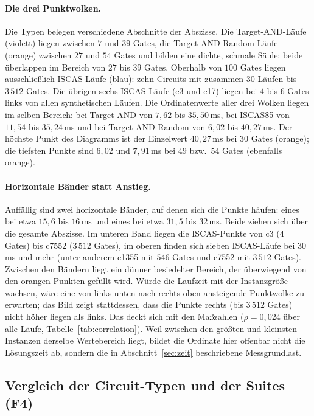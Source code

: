 \documentclass[a4paper,12pt]{article}
\theoremstyle{definition}
\begin{document}
\paragraph{Die drei Punktwolken.} Die Typen belegen verschiedene Abschnitte der Abszisse. Die Target-AND-Läufe (violett) liegen zwischen $7$ und $39$ Gates, die Target-AND-Random-Läufe (orange) zwischen $27$ und $54$ Gates und bilden eine dichte, schmale Säule; beide überlappen im Bereich von $27$ bis $39$ Gates. Oberhalb von $100$ Gates liegen ausschließlich ISCAS-Läufe (blau): zehn Circuits mit zusammen $30$ Läufen bis $3\,512$ Gates. Die übrigen sechs ISCAS-Läufe (c3 und c17) liegen bei $4$ bis $6$ Gates links von allen synthetischen Läufen. Die Ordinatenwerte aller drei Wolken liegen im selben Bereich: bei Target-AND von $7{,}62$ bis $35{,}50$\,ms, bei ISCAS\'85 von $11{,}54$ bis $35{,}24$\,ms und bei Target-AND-Random von $6{,}02$ bis $40{,}27$\,ms. Der höchste Punkt des Diagramms ist der Einzelwert $40{,}27$\,ms bei $30$ Gates (orange); die tiefsten Punkte sind $6{,}02$ und $7{,}91$\,ms bei $49$ bzw.\ $54$ Gates (ebenfalls orange).

\paragraph{Horizontale Bänder statt Anstieg.} Auffällig sind zwei horizontale Bänder, auf denen sich die Punkte häufen: eines bei etwa $15{,}6$ bis $16$\,ms und eines bei etwa $31{,}5$ bis $32$\,ms. Beide ziehen sich über die gesamte Abszisse. Im unteren Band liegen die ISCAS-Punkte von c3 ($4$ Gates) bis c7552 ($3\,512$ Gates), im oberen finden sich sieben ISCAS-Läufe bei $30$\,ms und mehr (unter anderem c1355 mit $546$ Gates und c7552 mit $3\,512$ Gates). Zwischen den Bändern liegt ein dünner besiedelter Bereich, der überwiegend von den orangen Punkten gefüllt wird. Würde die Laufzeit mit der Instanzgröße wachsen, wäre eine von links unten nach rechts oben ansteigende Punktwolke zu erwarten; das Bild zeigt stattdessen, dass die Punkte rechts (bis $3\,512$ Gates) nicht höher liegen als links. Das deckt sich mit den Maßzahlen ($\rho = 0{,}024$ über alle Läufe, Tabelle~\ref{tab:correlation}). Weil zwischen den größten und kleinsten Instanzen derselbe Wertebereich liegt, bildet die Ordinate hier offenbar nicht die Lösungszeit ab, sondern die in Abschnitt~\ref{sec:zeit} beschriebene Messgrundlast.

\subsection{Vergleich der Circuit-Typen und der Suites (F4)}
\end{document}
